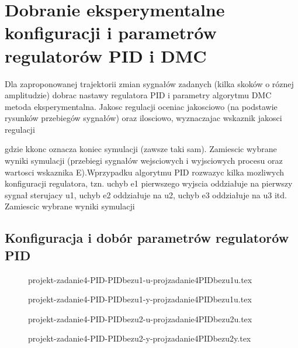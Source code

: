 \section{Dobranie eksperymentalne konfiguracji i parametrów regulatorów PID i DMC}
\label{projekt:zad4}

Dla zaproponowanej trajektorii zmian sygnałów zadanych (kilka skoków o róznej amplitudzie)
dobrac nastawy regulatora PID i parametry algorytmu DMC metoda eksperymentalna.
Jakosc regulacji oceniac jakosciowo (na podstawie rysunków przebiegów
sygnałów) oraz ilosciowo, wyznaczajac wskaznik jakosci regulacji

gdzie kkonc oznacza koniec symulacji (zawsze taki sam). Zamiescic wybrane wyniki symulacji
(przebiegi sygnałów wejsciowych i wyjsciowych procesu oraz wartosci wskaznika
E).Wprzypadku algorytmu PID rozwazyc kilka mozliwych konfiguracji regulatora,
tzn. uchyb e1 pierwszego wyjscia oddziałuje na pierwszy sygnał sterujacy u1, uchyb
e2 oddziałuje na u2, uchyb e3 oddziałuje na u3 itd. Zamiescic wybrane wyniki symulacji

\subsection{Konfiguracja i dobór parametrów regulatorów PID}

\begin{figure}[H] 
    \centering
    
    \caption{projekt-zadanie4-PID-PIDbezu1-u-projzadanie4PIDbezu1u.tex}
    \label{projekt:zad4:figure:uprojzadanie4PIDbezu1u}
\end{figure}

\begin{figure}[H] 
    \centering
    
    \caption{projekt-zadanie4-PID-PIDbezu1-y-projzadanie4PIDbezu1u.tex}
    \label{projekt:zad4:figure:yprojzadanie4PIDbezu1u}
\end{figure}

\begin{figure}[H] 
    \centering
    
    \caption{projekt-zadanie4-PID-PIDbezu2-u-projzadanie4PIDbezu2u.tex}
    \label{projekt:zad4:figure:projzadanie4PIDbezu2u}
\end{figure}

\begin{figure}[H] 
    \centering
    
    \caption{projekt-zadanie4-PID-PIDbezu2-y-projzadanie4PIDbezu2y.tex}
    \label{projekt:zad4:figure:projzadanie4PIDbezu2y}
\end{figure}

